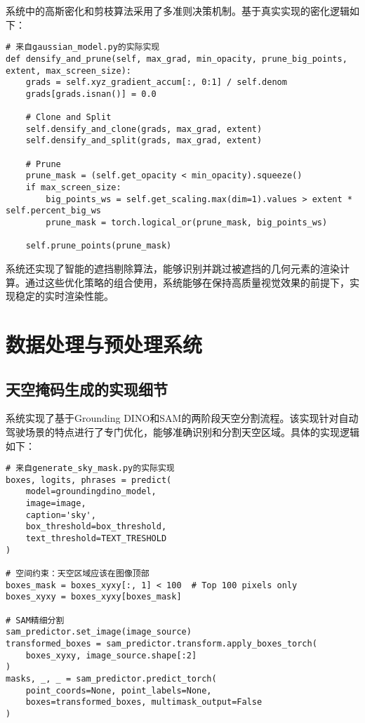 系统中的高斯密化和剪枝算法采用了多准则决策机制。基于真实实现的密化逻辑如下：

\begin{verbatim}
# 来自gaussian_model.py的实际实现
def densify_and_prune(self, max_grad, min_opacity, prune_big_points, extent, max_screen_size):
    grads = self.xyz_gradient_accum[:, 0:1] / self.denom
    grads[grads.isnan()] = 0.0
    
    # Clone and Split
    self.densify_and_clone(grads, max_grad, extent)
    self.densify_and_split(grads, max_grad, extent)
    
    # Prune
    prune_mask = (self.get_opacity < min_opacity).squeeze()
    if max_screen_size:
        big_points_ws = self.get_scaling.max(dim=1).values > extent * self.percent_big_ws
        prune_mask = torch.logical_or(prune_mask, big_points_ws)
    
    self.prune_points(prune_mask)
\end{verbatim}

系统还实现了智能的遮挡剔除算法，能够识别并跳过被遮挡的几何元素的渲染计算。通过这些优化策略的组合使用，系统能够在保持高质量视觉效果的前提下，实现稳定的实时渲染性能。

\section{数据处理与预处理系统}

\subsection{天空掩码生成的实现细节}

系统实现了基于Grounding DINO和SAM的两阶段天空分割流程。该实现针对自动驾驶场景的特点进行了专门优化，能够准确识别和分割天空区域。具体的实现逻辑如下：

\begin{verbatim}
# 来自generate_sky_mask.py的实际实现
boxes, logits, phrases = predict(
    model=groundingdino_model, 
    image=image, 
    caption='sky', 
    box_threshold=box_threshold, 
    text_threshold=TEXT_TRESHOLD
)

# 空间约束：天空区域应该在图像顶部
boxes_mask = boxes_xyxy[:, 1] < 100  # Top 100 pixels only
boxes_xyxy = boxes_xyxy[boxes_mask]

# SAM精细分割
sam_predictor.set_image(image_source)
transformed_boxes = sam_predictor.transform.apply_boxes_torch(
    boxes_xyxy, image_source.shape[:2]
)
masks, _, _ = sam_predictor.predict_torch(
    point_coords=None, point_labels=None,
    boxes=transformed_boxes, multimask_output=False
)
\end{verbatim}

